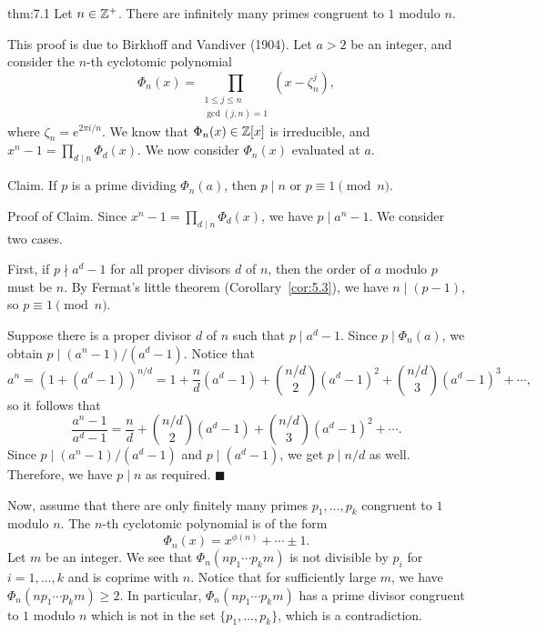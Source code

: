 \begin{theo}{thm:7.1} 
    Let $n \in \mathbb{Z}^+$. There are infinitely many primes congruent to $1$ modulo $n$.
\end{theo}
\begin{pf}
    This proof is due to Birkhoff and Vandiver (1904). Let $a > 2$ be an integer, 
    and consider the $n$-th cyclotomic polynomial
    \[ \Phi_n(x) = \prod_{\substack{1\leq j \leq n \\ \gcd(j, n) = 1}} 
    (x - \zeta_n^j), \] 
    where $\zeta_n = e^{2\pi i/n}$. We know that $\Phi_n(x) \in \mathbb{Z}[x]$ is irreducible, 
    and $x^n - 1 = \prod_{d\mid n} \Phi_d(x)$. We now consider $\Phi_n(x)$ 
    evaluated at $a$. 

    {\sc Claim.} If $p$ is a prime dividing $\Phi_n(a)$, then $p \mid n$ or 
    $p \equiv 1 \pmod n$. 

    {\sc Proof of Claim.} Since $x^n - 1 = \prod_{d\mid n} \Phi_d(x)$, we have 
    $p \mid a^n - 1$. We consider two cases. 

    First, if $p \nmid a^d - 1$ for all proper divisors $d$ of $n$, then the order of 
    $a$ modulo $p$ must be $n$. By Fermat's little theorem (Corollary~\ref{cor:5.3}), 
    we have $n \mid (p-1)$, so $p \equiv 1 \pmod n$. 

    Suppose there is a proper divisor $d$ of $n$ such that $p \mid a^d - 1$. Since 
    $p \mid \Phi_n(a)$, we obtain $p \mid (a^n - 1)/(a^d - 1)$. Notice that 
    \[ a^n = \left( 1 + (a^d - 1) \right)^{n/d} = 1 + \frac{n}{d} (a^d - 1) 
    + \binom{n/d}{2} (a^d - 1)^2 + \binom{n/d}{3} (a^d - 1)^3 + \cdots, \] 
    so it follows that 
    \[ \frac{a^n - 1}{a^d - 1} = \frac{n}{d} + \binom{n/d}{2} (a^d - 1) 
    + \binom{n/d}{3} (a^d - 1)^2 + \cdots. \] 
    Since $p \mid (a^n-1)/(a^d-1)$ and $p \mid (a^d-1)$, we get $p \mid n/d$ as well. 
    Therefore, we have $p \mid n$ as required. \hfill$\blacksquare$ 

    Now, assume that there are only finitely many primes $p_1, \dots, p_k$ 
    congruent to $1$ modulo $n$. The $n$-th cyclotomic polynomial is of the form 
    \[ \Phi_n(x) = x^{\phi(n)} + \cdots \pm 1. \] 
    Let $m$ be an integer. We see that $\Phi_n(np_1 \cdots p_k m)$ is not divisible 
    by $p_i$ for $i = 1, \dots, k$ and is coprime with $n$. Notice that for sufficiently 
    large $m$, we have $\Phi_n(np_1 \cdots p_km) \geq 2$. In particular, 
    $\Phi_n(np_1 \cdots p_km)$ has a prime divisor congruent to $1$ modulo $n$ 
    which is not in the set $\{p_1, \dots, p_k\}$, which is a contradiction. 
\end{pf}

